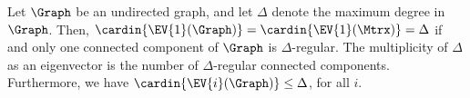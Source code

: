 \begin{lemma}
    Let $\Graph$ be an undirected graph, and let $\Delta$ denote the
    maximum degree in $\Graph$. Then,
    $\cardin{\smash{\EV{1}(\Graph)}} =
    \cardin{\smash{\EV{1}(\Mtrx)}}=\Delta$ if and only one connected
    component of $\Graph$ is $\Delta$-regular. The multiplicity of
    $\Delta$ as an eigenvector is the number of $\Delta$-regular
    connected components. Furthermore, we have
    $\cardin{\smash{\EV{i}(\Graph)}} \leq \Delta$, for all $i$.

\end{lemma}
